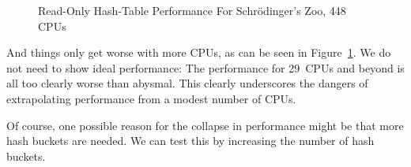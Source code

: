 \begin{figure}[tb]
\centering
{}
\caption{Read-Only Hash-Table Performance For Schr\"odinger's Zoo, 448 CPUs}
\label{fig:datastruct:Read-Only Hash-Table Performance For Schroedinger's Zoo; 448 CPUs}
\end{figure}

And things only get worse with more CPUs, as can be seen in
Figure~\ref{fig:datastruct:Read-Only Hash-Table Performance For Schroedinger's Zoo; 448 CPUs}.
We do not need to show ideal performance: The performance for 29~CPUs
and beyond is all too clearly worse than abysmal.
This clearly underscores the dangers of extrapolating performance from a
modest number of CPUs.

Of course, one possible reason for the collapse in performance might be
that more hash buckets are needed.
We can test this by increasing the number of hash buckets.

\QuickQuizEnd


